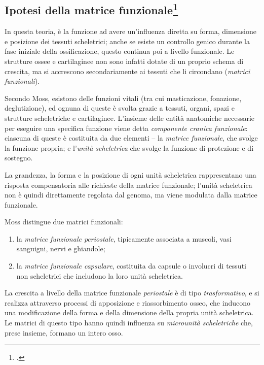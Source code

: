 \subsection*{Ipotesi della matrice funzionale\protect\footcite{Moss1960,Moss1969}}
In questa teoria, è la funzione ad avere un'influenza diretta su forma, dimensione e posizione dei tessuti scheletrici; anche se esiste un controllo genico durante la fase iniziale della ossificazione, questo continua poi a livello funzionale. Le strutture ossee e cartilaginee non sono infatti dotate di un proprio schema di crescita, ma si accrescono secondariamente ai tessuti che li circondano (\textit{matrici funzionali}).

Secondo Moss, esistono delle funzioni vitali (tra cui masticazione, fonazione, deglutizione), ed ognuna di queste è svolta grazie a tessuti, organi, spazi e strutture scheletriche e cartilaginee. L'insieme delle entità anatomiche necessarie per eseguire una specifica funzione viene detta \textit{componente cranica funzionale}: ciascuna di queste è costituita da due elementi -- la \textit{matrice funzionale}, che svolge la funzione propria; e l'\textit{unità scheletrica} che svolge la funzione di protezione e di sostegno.

La grandezza, la forma e la posizione di ogni unità scheletrica rappresentano una risposta compensatoria alle richieste della matrice funzionale; l'unità scheletrica non è quindi direttamente regolata dal genoma, ma viene modulata dalla matrice funzionale.

Moss distingue due matrici funzionali:

\begin{enumerate}
\item la \textit{matrice funzionale periostale}, tipicamente associata a muscoli, vasi sanguigni, nervi e ghiandole;
\item la \textit{matrice funzionale capsulare}, costituita da capsule o involucri di tessuti non scheletrici che includono la loro unità scheletrica.
\end{enumerate}

La crescita a livello della matrice funzionale \textit{periostale} è di tipo \textit{trasformativo}, e si realizza attraverso processi di apposizione e riassorbimento osseo, che inducono una modificazione della forma e della dimensione della propria unità scheletrica. Le matrici di questo tipo hanno quindi influenza su \textit{microunità scheletriche} che, prese insieme, formano un intero osso.

